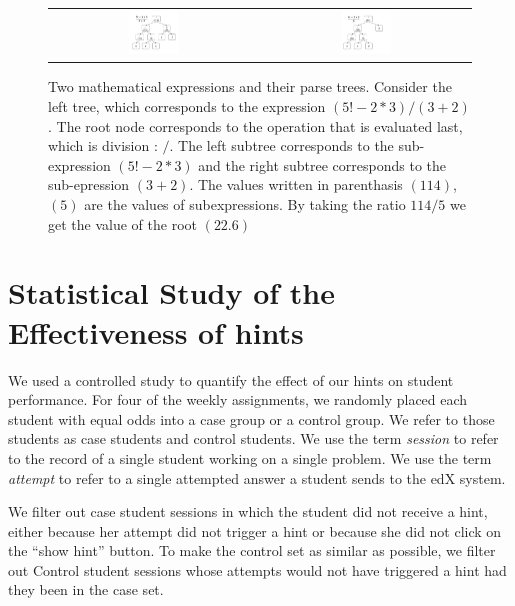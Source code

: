\documentclass{sigchi}
\begin{document}
\begin{figure}[ht]
  \centering
   \begin{tabular}{c c}
		\includegraphics[width=0.25\textwidth]{image/ParseTrees1.png} &
		\includegraphics[width=0.25\textwidth]{image/ParseTrees2.png}
	\end{tabular}
   \caption{Two mathematical expressions and their parse
     trees. Consider the left tree, which corresponds to the
     expression $(5!-2*3)/(3+2)$. The root node corresponds to the
     operation that is evaluated last, which is division : $/$. The
     left subtree corresponds to the sub-expression $(5!-2*3)$ and the
     right subtree corresponds to the sub-epression $(3+2)$. The
     values written in parenthasis $(114)$,$(5)$ are the values of
     subexpressions. By taking the ratio $114/5$ we get the value of
     the root $(22.6)$}
   \label{fig:parse_tree}
\end{figure}

\section{Statistical Study of the Effectiveness of hints}

We used a controlled study to quantify the effect of our hints on
student performance. For four of the weekly assignments, we randomly
placed each student with equal odds into a case group or a control
group. We refer to those students as case students and control
students.  We use the term {\em session} to refer to the record of a
single student working on a single problem. We use the term {\em
  attempt} to refer to a single attempted answer a student sends to
the edX system.

We filter out case student sessions in which the student did not
receive a hint, either because her attempt did not trigger a hint or
because she did not click on the ``show hint'' button.  To make the
control set as similar as possible, we filter out Control student
sessions whose attempts would not have triggered a hint had they been
in the case set.
\end{document}
